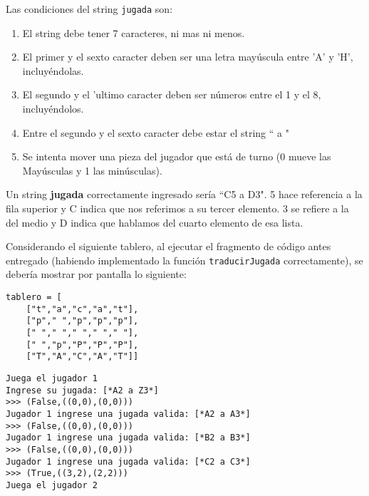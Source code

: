 Las condiciones del string \texttt{jugada} son:
\begin{enumerate}
    \item El string debe tener 7 caracteres, ni mas ni menos.
    \item El primer y el sexto caracter deben ser una letra mayúscula entre 'A' y 'H', incluyéndolas.
    \item El segundo y el 'ultimo caracter deben ser números entre el 1 y el 8, incluyéndolos.
    \item Entre el segundo y el sexto caracter debe estar el string `` a "
    \item Se intenta mover una pieza del jugador que está de turno (0 mueve las Mayúsculas y 1 las minúsculas).
\end{enumerate}

Un string \textbf{jugada} correctamente ingresado sería ``C5 a D3". 5 hace referencia a la fila superior y C indica que nos referimos a su tercer elemento. 3 se refiere a la del medio y D indica que hablamos del cuarto elemento de esa lista. 

Considerando el siguiente tablero, al ejecutar el fragmento de código antes entregado (habiendo implementado la función \texttt{traducirJugada} correctamente), se debería mostrar por pantalla lo siguiente:

\begin{lstlisting}[style=consola]
tablero = [
    ["t","a","c","a","t"],
    ["p"," ","p","p","p"],
    [" "," "," "," "," "],
    [" ","p","P","P","P"],
    ["T","A","C","A","T"]]
\end{lstlisting}

\begin{lstlisting}[style=consola]
Juega el jugador 1
Ingrese su jugada: [*A2 a Z3*]
>>> (False,((0,0),(0,0)))  
Jugador 1 ingrese una jugada valida: [*A2 a A3*]
>>> (False,((0,0),(0,0)))
Jugador 1 ingrese una jugada valida: [*B2 a B3*]
>>> (False,((0,0),(0,0)))
Jugador 1 ingrese una jugada valida: [*C2 a C3*]
>>> (True,((3,2),(2,2)))
Juega el jugador 2
\end{lstlisting}



